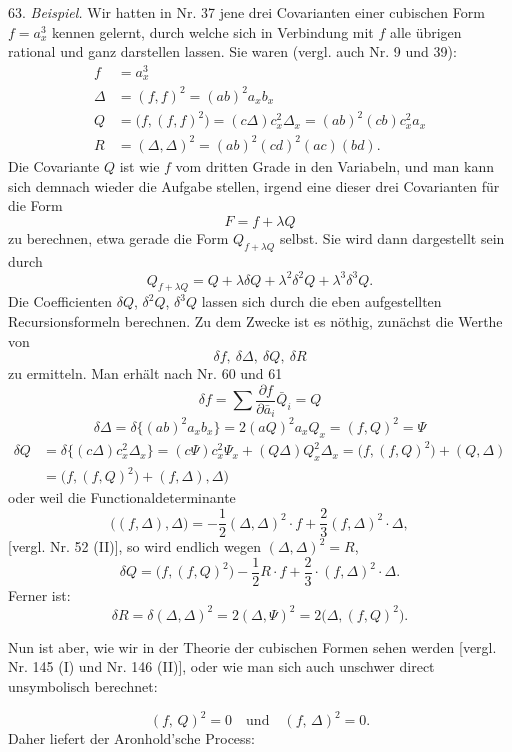 \documentclass[11pt]{article}
\providecommand{\weberpage}[1]{}
\providecommand{\weq}[2]{\begin{equation}\tag{#1}#2\end{equation}}
\let\Delta\varDelta
\let\Psi\varPsi
\begin{document}
63. \textit{Beispiel.} Wir hatten in Nr. 37 jene drei Covarianten einer cubischen Form $f=a_x^3$ kennen gelernt, durch welche sich in Verbindung mit $f$ alle übrigen rational und ganz darstellen lassen. Sie waren (vergl. auch Nr. 9 und 39):
\[
\begin{aligned}
f &= a_x^3\\
\Delta &= (f,f)^2 = (ab)^2a_xb_x\\
Q &= \big(f,(f,f)^2\big) = (c\Delta)c_x^2\Delta_x = (ab)^2(cb)c_x^2a_x\\
R &= (\Delta,\Delta)^2 = (ab)^2(cd)^2(ac)(bd).
\end{aligned}
\]
Die Covariante $Q$ ist wie $f$ vom dritten Grade in den Variabeln, und man kann sich demnach wieder die Aufgabe stellen, irgend eine dieser drei Covarianten für die Form
\[
F = f + \lambda Q
\]
zu berechnen, etwa gerade die Form $Q_{f+\lambda Q}$ selbst. Sie wird dann dargestellt sein durch
\weq{I}{Q_{f+\lambda Q} = Q + \lambda\delta Q + \lambda^2\delta^2 Q + \lambda^3\delta^3 Q.}
Die Coefficienten $\delta Q$, $\delta^2 Q$, $\delta^3 Q$ lassen sich durch die eben aufgestellten Recursionsformeln berechnen. Zu dem Zwecke ist es nöthig, zunächst die Werthe von
\[
\delta f,\ \delta\Delta,\ \delta Q,\ \delta R
\]
zu ermitteln. Man erhält nach Nr. 60 und 61
\weq{1}{\delta f = \sum \frac{\partial f}{\partial \bar a_i}\bar Q_i = Q}
\weq{2}{\delta\Delta = \delta\{(ab)^2a_xb_x\} = 2(aQ)^2a_xQ_x = (f,Q)^2 = \Psi}
\weq{3}{\begin{aligned}
\delta Q &= \delta\{(c\Delta)c_x^2\Delta_x\} = (c\Psi)c_x^2\Psi_x + (Q\Delta)Q_x^2\Delta_x = \big(f,(f,Q)^2\big) + (Q,\Delta)\\
&= \big(f,(f,Q)^2\big) + (f,\Delta),\Delta) %
\end{aligned}}
oder weil die Functionaldeterminante
\[
\big((f,\Delta),\Delta\big) = -\frac{1}{2}(\Delta,\Delta)^2\cdot f + \frac{2}{3}(f,\Delta)^2\cdot\Delta,
\]
[vergl. Nr. 52 (II)], so wird endlich wegen $(\Delta,\Delta)^2=R$,
\[
\delta Q = \big(f,(f,Q)^2\big) - \frac{1}{2}R\cdot f + \frac{2}{3}\cdot(f,\Delta)^2\cdot\Delta.
\]
Ferner ist:
\weq{4}{\delta R = \delta(\Delta,\Delta)^2 = 2(\Delta,\Psi)^2 = 2\big(\Delta,(f,Q)^2\big).}


\weberpage{69}
Nun ist aber, wie wir in der Theorie der cubischen Formen sehen werden [vergl. Nr. 145 (I) und Nr. 146 (II)], oder wie man sich auch unschwer direct unsymbolisch berechnet:

\weq{5}{
(f,\, Q)^2 = 0 \quad \text{und} \quad (f,\, \Delta)^2 = 0.
}
Daher liefert der Aronhold'sche Process:
\end{document}
